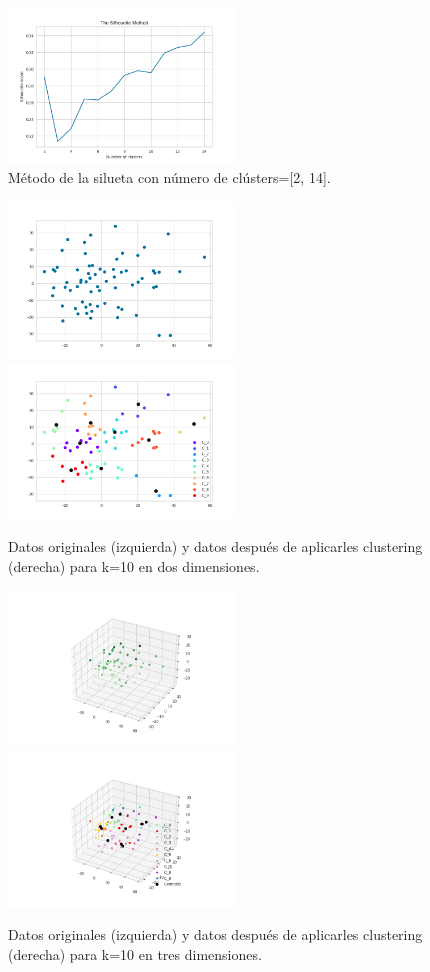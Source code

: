 \documentclass[10pt, a4paper]{article}
\begin{document}
		\begin{figure}[hbt!]
			\centering
			\includegraphics[width = 6cm]{SilhouetteM_bf.png}
			\caption{M\'etodo de la silueta con n\'umero de cl\'usters=[2, 14].}
		\end{figure}
		
		\begin{figure}[hbt!]
			\centering
			\includegraphics[width = 6cm]{Original_Data_2d_bf.png}
			\includegraphics[width = 6cm]{Clustered_Data_2d_k10_seed45_bf.png}
			\caption{Datos originales (izquierda) y datos despu\'es de aplicarles clustering (derecha) para k=10 en dos dimensiones.}
		\end{figure}
		
		\begin{figure}[h!]
			\centering
			\includegraphics[width = 6cm]{Original_Data_3d_bf.png}
			\includegraphics[width = 6cm]{Clustered_Data_3d_k10_seed45_bf.png}
			\caption{Datos originales (izquierda) y datos despu\'es de aplicarles clustering (derecha) para k=10 en tres dimensiones.}
		\end{figure}
		
\end{document}
